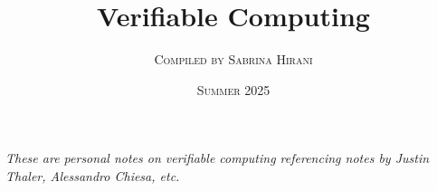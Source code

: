\documentclass[10pt]{article}
\title{\Huge \bfseries Verifiable Computing}
\author{\large \scshape Compiled by Sabrina Hirani}
\date{\Large \scshape Summer 2025}
\begin{document}
\maketitle 

\noindent \textit{These are personal notes on verifiable computing referencing notes by Justin Thaler, Alessandro Chiesa, etc.}





\tableofcontents 



\newpage



\newpage



\newpage


\end{document}
